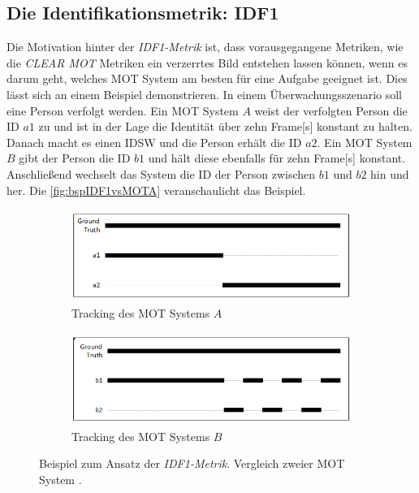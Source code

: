 \subsection{Die Identifikationsmetrik: IDF1} \label{sec:MOT F1}
Die Motivation hinter der \textit{\gls{IDF1}-Metrik} ist, dass vorausgegangene Metriken, wie die \textit{\acrshort{CLEAR} \gls{MOT}} Metriken ein verzerrtes Bild entstehen lassen können, wenn es darum geht, welches \gls{MOT} System am besten für eine Aufgabe geeignet ist. Dies lässt sich an einem Beispiel demonstrieren. In einem Überwachungsszenario soll eine Person verfolgt werden. Ein \gls{MOT} System \(A\) weist der verfolgten Person die \acrshort{ID} \(a1\) zu und ist in der Lage die Identität über zehn \gls{Frame}[s] konstant zu halten. Danach macht es einen \gls{IDSW} und die Person erhält die \acrshort{ID} \(a2\). Ein \gls{MOT} System \(B\) gibt der Person die \acrshort{ID} \(b1\) und hält diese ebenfalls für zehn \gls{Frame}[s] konstant. Anschließend wechselt das System die \acrshort{ID} der Person zwischen \(b1\) und \(b2\) hin und her. Die \autoref{fig:bspIDF1vsMOTA} veranschaulicht das Beispiel.

\begin{figure}[htb]
     \centering
     \begin{subfigure}[b]{0.49\textwidth}
         \centering
         \includegraphics[width=\textwidth, height=3cm]{img/Grafiken/IDF1 bsp Motivation 1.png}
         \caption{Tracking des MOT Systems \(A\)}
     \end{subfigure}
     \hfill
     \begin{subfigure}[b]{0.49\textwidth}
         \centering
         \includegraphics[width=\textwidth, height=3cm]{img/Grafiken/IDF1 bsp Motivation 2.png}
         \caption{Tracking des MOT Systems \(B\)}
     \end{subfigure}
     \caption[Beispiel zum Ansatz der \textit{\gls{IDF1}-Metrik}.]{Beispiel zum Ansatz der \textit{\gls{IDF1}-Metrik}. Vergleich zweier MOT System \cite{HOTA}.}
     \label{fig:bspIDF1vsMOTA}
\end{figure}


